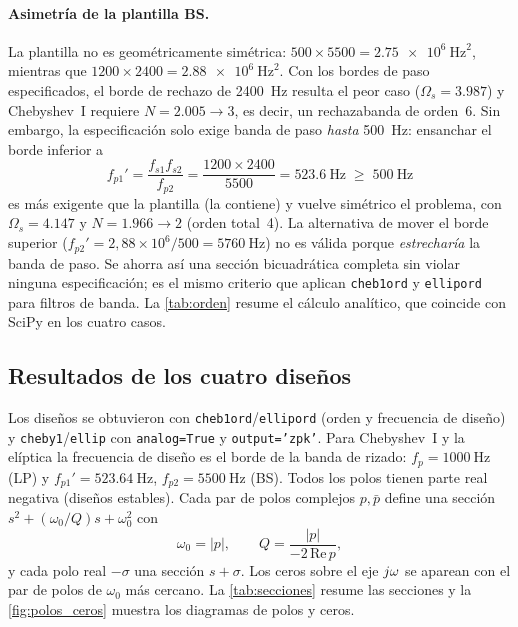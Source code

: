 \paragraph{Asimetría de la plantilla BS.} La plantilla no es geométricamente simétrica:
$500\times5500 = \qty{2.75e6}{\hertz\squared}$, mientras que $1200\times2400 = \qty{2.88e6}{\hertz\squared}$. Con los bordes de paso
especificados, el borde de rechazo de \qty{2400}{\hertz} resulta el peor caso ($\Omega_s = \num{3.987}$) y Chebyshev~I requiere
$N = \num{2.005} \to 3$, es decir, un rechazabanda de orden~6. Sin embargo, la especificación solo exige banda de paso \emph{hasta}
\qty{500}{\hertz}: ensanchar el borde inferior a
\begin{equation}
  f_{p1}' = \frac{f_{s1} f_{s2}}{f_{p2}} = \frac{1200\times2400}{5500} = \qty{523.6}{\hertz} \;\ge\; \qty{500}{\hertz}
\end{equation}
es más exigente que la plantilla (la contiene) y vuelve simétrico el problema, con $\Omega_s = \num{4.147}$ y $N = \num{1.966} \to 2$
(orden total~4). La alternativa de mover el borde superior ($f_{p2}' = 2{,}88\times10^6/500 = \qty{5760}{\hertz}$) no es válida porque
\emph{estrecharía} la banda de paso. Se ahorra así una sección bicuadrática completa sin violar ninguna especificación; es el mismo criterio
que aplican \texttt{cheb1ord} y \texttt{ellipord} para filtros de banda. La \cref{tab:orden} resume el cálculo analítico, que coincide
con SciPy en los cuatro casos.

\begin{table}[H]
  \centering\small
  \caption{Orden mínimo según las \cref{eq:orden_cheby,eq:orden_elip}. Para el BS, $N$ es el orden del prototipo (orden total $2N$).}
  \label{tab:orden}
\end{table}

\subsection{Resultados de los cuatro diseños}

Los diseños se obtuvieron con \texttt{cheb1ord}/\texttt{ellipord} (orden y frecuencia de diseño) y \texttt{cheby1}/\texttt{ellip} con
\texttt{analog=True} y \texttt{output='zpk'}. Para Chebyshev~I y la elíptica la frecuencia de diseño es el borde de la banda de rizado:
$f_p = \qty{1000}{\hertz}$ (LP) y $f_{p1}' = \qty{523.64}{\hertz}$, $f_{p2} = \qty{5500}{\hertz}$ (BS). Todos los polos tienen parte real
negativa (diseños estables). Cada par de polos complejos $p,\bar p$ define una sección $s^2 + (\omega_0/Q)s + \omega_0^2$ con
\begin{equation}
  \omega_0 = \lvert p\rvert, \qquad Q = \frac{\lvert p\rvert}{-2\,\mathrm{Re}\,p},
  \label{eq:w0Q}
\end{equation}
y cada polo real $-\sigma$ una sección $s+\sigma$. Los ceros sobre el eje $j\omega$ se aparean con el par de polos de $\omega_0$ más cercano.
La \cref{tab:secciones} resume las secciones y la \cref{fig:polos_ceros} muestra los diagramas de polos y ceros.


